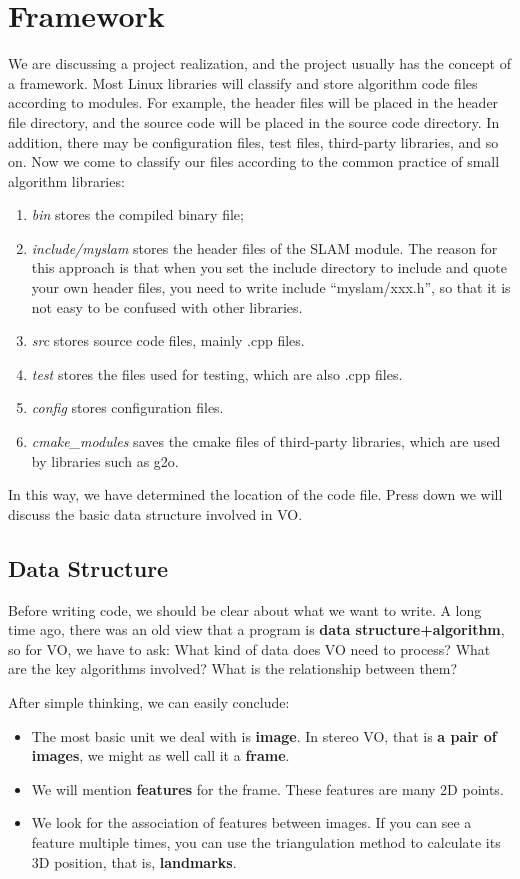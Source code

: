 \section{Framework}
We are discussing a project realization, and the project usually has the concept of a framework. Most Linux libraries will classify and store algorithm code files according to modules. For example, the header files will be placed in the header file directory, and the source code will be placed in the source code directory. In addition, there may be configuration files, test files, third-party libraries, and so on. Now we come to classify our files according to the common practice of small algorithm libraries:

\begin{enumerate}
	\item \textit{bin} stores the compiled binary file;
	\item \textit{include/myslam} stores the header files of the SLAM module. The reason for this approach is that when you set the include directory to include and quote your own header files, you need to write include ``myslam/xxx.h'', so that it is not easy to be confused with other libraries.
	\item \textit{src} stores source code files, mainly .cpp files.
	\item \textit{test} stores the files used for testing, which are also .cpp files.
	\item \textit{config} stores configuration files.
	\item \textit{cmake\_modules} saves the cmake files of third-party libraries, which are used by  libraries such as g2o.
\end{enumerate}

In this way, we have determined the location of the code file. Press down we will discuss the basic data structure involved in VO.

\subsection{Data Structure}
Before writing code, we should be clear about what we want to write. A long time ago, there was an old view that a program is \textbf{data structure+algorithm}, so for VO, we have to ask: What kind of data does VO need to process? What are the key algorithms involved? What is the relationship between them?

After simple thinking, we can easily conclude:
\begin{itemize}
	\item The most basic unit we deal with is \textbf{image}. In stereo VO, that is \textbf{a pair of images}, we might as well call it a \textbf{frame}.
	\item We will mention \textbf{features} for the frame. These features are many 2D points.
	\item We look for the association of features between images. If you can see a feature multiple times, you can use the triangulation method to calculate its 3D position, that is, \textbf{landmarks}.
\end{itemize}

